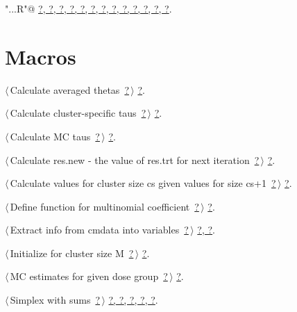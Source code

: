 \documentclass[reqno]{amsart}
\renewcommand{\NWlink}[2]{\hyperlink{#1}{#2}}
\begin{document}
{\small\begin{list}{}{\setlength{\itemsep}{-\parsep}\setlength{\itemindent}{-\leftmargin}}
\item \verb@"..\R\ExchMultinomial.R"@ {\footnotesize {\NWtxtDefBy} \NWlink{nuweb?}{?}\NWlink{nuweb?}{, ?}\NWlink{nuweb?}{, ?}\NWlink{nuweb?}{, ?}\NWlink{nuweb?}{, ?}\NWlink{nuweb?}{, ?}\NWlink{nuweb?}{, ?}\NWlink{nuweb?}{, ?}\NWlink{nuweb?}{, ?}\NWlink{nuweb?}{, ?}\NWlink{nuweb?}{, ?}\NWlink{nuweb?}{, ?}\NWlink{nuweb?}{, ?}.
}
\end{list}}

\section{Macros}


{\small\begin{list}{}{\setlength{\itemsep}{-\parsep}\setlength{\itemindent}{-\leftmargin}}
\item $\langle\,$Calculate averaged thetas\nobreak\ {\footnotesize \NWlink{nuweb?}{?}}$\,\rangle$ {\footnotesize {\NWtxtRefIn} \NWlink{nuweb?}{?}.}
\item $\langle\,$Calculate cluster-specific taus\nobreak\ {\footnotesize \NWlink{nuweb?}{?}}$\,\rangle$ {\footnotesize {\NWtxtRefIn} \NWlink{nuweb?}{?}.}
\item $\langle\,$Calculate MC taus\nobreak\ {\footnotesize \NWlink{nuweb?}{?}}$\,\rangle$ {\footnotesize {\NWtxtRefIn} \NWlink{nuweb?}{?}.}
\item $\langle\,$Calculate res.new - the value of res.trt for next iteration\nobreak\ {\footnotesize \NWlink{nuweb?}{?}}$\,\rangle$ {\footnotesize {\NWtxtRefIn} \NWlink{nuweb?}{?}.}
\item $\langle\,$Calculate values for cluster size cs given values for size cs+1\nobreak\ {\footnotesize \NWlink{nuweb?}{?}}$\,\rangle$ {\footnotesize {\NWtxtRefIn} \NWlink{nuweb?}{?}.}
\item $\langle\,$Define function for multinomial coefficient\nobreak\ {\footnotesize \NWlink{nuweb?}{?}}$\,\rangle$ {\footnotesize {\NWtxtRefIn} \NWlink{nuweb?}{?}.}
\item $\langle\,$Extract info from cmdata into variables\nobreak\ {\footnotesize \NWlink{nuweb?}{?}}$\,\rangle$ {\footnotesize {\NWtxtRefIn} \NWlink{nuweb?}{?}\NWlink{nuweb?}{, ?}.
}
\item $\langle\,$Initialize for cluster size M\nobreak\ {\footnotesize \NWlink{nuweb?}{?}}$\,\rangle$ {\footnotesize {\NWtxtRefIn} \NWlink{nuweb?}{?}.}
\item $\langle\,$MC estimates for given dose group\nobreak\ {\footnotesize \NWlink{nuweb?}{?}}$\,\rangle$ {\footnotesize {\NWtxtRefIn} \NWlink{nuweb?}{?}.}
\item $\langle\,$Simplex with sums\nobreak\ {\footnotesize \NWlink{nuweb?}{?}}$\,\rangle$ {\footnotesize {\NWtxtRefIn} \NWlink{nuweb?}{?}\NWlink{nuweb?}{, ?}\NWlink{nuweb?}{, ?}\NWlink{nuweb?}{, ?}\NWlink{nuweb?}{, ?}.
}
\end{list}}
\end{document}

